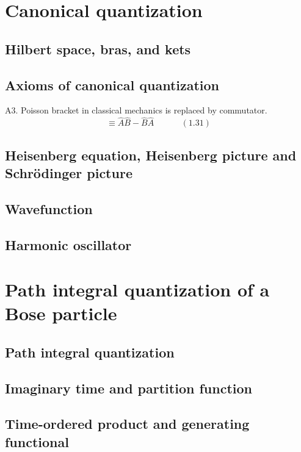 \documentclass{book}
\begin{document}
\section{ Canonical quantization }
\subsection{Hilbert space, bras, and kets}
\subsection{Axioms of canonical quantization}

A3. Poisson bracket in classical mechanics is replaced by commutator. 
\begin{equation}
  [ \widehat{A}, \widehat{B} ] \equiv \widehat{A} \widehat{B} - \widehat{B} \widehat{A} \quad \quad \quad \, (1.31)
\end{equation}


\subsection{ Heisenberg equation, Heisenberg picture and Schr\"{o}dinger picture}

\subsection{Wavefunction}

\subsection{Harmonic oscillator}

\section{ Path integral quantization of a Bose particle}

\subsection{Path integral quantization}

\subsection{Imaginary time and partition function}

\subsection{Time-ordered product and generating functional }
\end{document}
